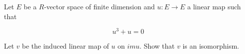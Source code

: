 Let $E$ be a $R$-vector space of finite dimension and $u: E \to E$ a linear map such that

\[u^3 + u = 0\]

Let $v$ be the induced linear map of $u$ on $im u$. Show that $v$ is an isomorphism.
